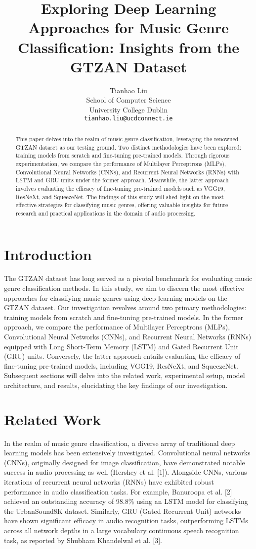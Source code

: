 \documentclass{article}
\title{Exploring Deep Learning Approaches for Music Genre Classification: Insights from the GTZAN Dataset}
\author{%
  Tianhao Liu \\
  School of Computer Science\\
  University College Dublin\\
  \texttt{tianhao.liu@ucdconnect.ie} \\
}
\begin{document}
\maketitle

\begin{abstract}
  This paper delves into the realm of music genre classification, leveraging the renowned GTZAN dataset as our testing ground. 
  Two distinct methodologies have been explored: training models from scratch and fine-tuning pre-trained models. 
  Through rigorous experimentation, we compare the performance of Multilayer Perceptrons (MLPs), Convolutional Neural Networks (CNNs), and Recurrent Neural Networks (RNNs) with LSTM and GRU units under the former approach. 
  Meanwhile, the latter approach involves evaluating the efficacy of fine-tuning pre-trained models such as VGG19, ResNeXt, and SqueezeNet. 
  The findings of this study will shed light on the most effective strategies for classifying music genres, offering valuable insights for future research and practical applications in the domain of audio processing.
\end{abstract}

\section{Introduction}
The GTZAN dataset has long served as a pivotal benchmark for evaluating music genre classification methods. 
In this study, we aim to discern the most effective approaches for classifying music genres using deep learning models on the GTZAN dataset. Our investigation revolves around two primary methodologies: training models from scratch and fine-tuning pre-trained models. 
In the former approach, we compare the performance of Multilayer Perceptrons (MLPs), Convolutional Neural Networks (CNNs), and Recurrent Neural Networks (RNNs) equipped with Long Short-Term Memory (LSTM) and Gated Recurrent Unit (GRU) units. 
Conversely, the latter approach entails evaluating the efficacy of fine-tuning pre-trained models, including VGG19, ResNeXt, and SqueezeNet.
Subsequent sections will delve into the related work, experimental setup, model architecture, and results, elucidating the key findings of our investigation.


\section{Related Work}
In the realm of music genre classification, a diverse array of traditional deep learning models has been extensively investigated. Convolutional neural networks (CNNs), originally designed for image classification, have demonstrated notable success in audio processing as well (Hershey et al. [1]). 
Alongside CNNs, various iterations of recurrent neural networks (RNNs) have exhibited robust performance in audio classification tasks. For example, Banuroopa et al. [2] achieved an outstanding accuracy of 98.8\% using an LSTM model for classifying the UrbanSound8K dataset. 
Similarly, GRU (Gated Recurrent Unit) networks have shown significant efficacy in audio recognition tasks, outperforming LSTMs across all network depths in a large vocabulary continuous speech recognition task, as reported by Shubham Khandelwal et al. [3].
\end{document}
